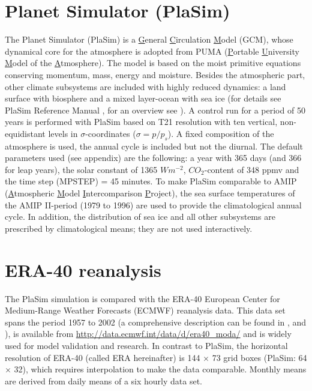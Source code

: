 \documentclass[12pt,a4paper,twoside,openright,headinclude,liststotoc,bibtotoc]{scrreprt}
\begin{document}
\vspace{-0.4cm}
\section{Planet Simulator (PlaSim)}
\vspace{-0.4cm}
The Planet Simulator (PlaSim) is a {\underline{G}eneral \underline{C}irculation \underline{M}odel} (GCM), whose dynamical core for the atmosphere is adopted from PUMA (\underline{P}ortable \underline{U}niversity \underline{M}odel of the \underline{A}tmosphere). The model is based on the moist primitive equations conserving momentum, mass, energy and moisture. Besides the atmospheric part, other climate subsystems are included with highly reduced dynamics: a land surface with biosphere and a mixed layer-ocean with sea ice (for details see PlaSim Reference Manual \citet{Lunkeit2007a}, for an overview see \citet{Fraedrich2005aa}). A control run for a period of 50 years is performed with PlaSim based on T21 resolution with ten vertical, non-equidistant levels in $\sigma$-coordinates ($\sigma=p/p_{s}$). A fixed composition of the atmosphere is used, the annual cycle is included but not the diurnal. The default parameters used (see appendix) are the following: a year with 365 days (and 366 for leap years), the solar constant of 1365 ${Wm^{-2}}$, $CO_{2}$-content of 348 ppmv and the time step (MPSTEP) = 45 minutes. To make PlaSim comparable to AMIP (\underline{A}tmospheric \underline{M}odel \underline{I}ntercomparison \underline{P}roject), the sea surface temperatures of the AMIP II-period (1979 to 1996) are used to provide the climatological annual cycle. In addition, the distribution of sea ice and all other subsystems are prescribed by climatological means; they are not used interactively.

\vspace{-0.4cm}
\section{ERA-40 reanalysis}
\vspace{-0.4cm}
The PlaSim simulation is compared with the ERA-40 European Center for Medium-Range Weather Forecasts (ECMWF) reanalysis data. This data set spans the period 1957 to 2002 (a comprehensive description can be found in \citet {Kaallberg2005}, \citet{Gibson1997} and \citet{Simmons2000}), is available from \url{http://data.ecmwf.int/data/d/era40_moda/} and is widely used for model validation and research. In contrast to PlaSim, the horizontal resolution of ERA-40 (called ERA hereinafter) is 144 $\times$ 73 grid boxes (PlaSim: 64 $\times$ 32), which requires interpolation to make the data comparable. Monthly means are derived from daily means of a six hourly data set. 
\end{document}
